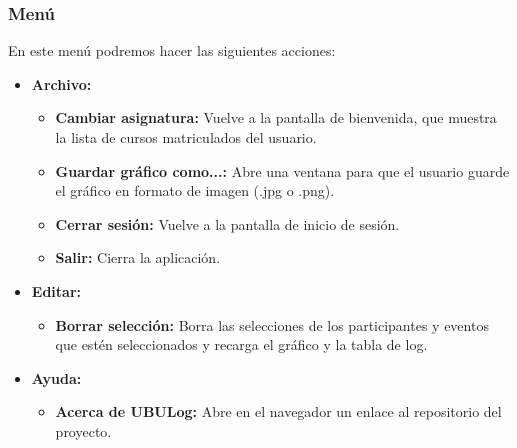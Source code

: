 
\subsubsection{Menú}


En este menú podremos hacer las siguientes acciones:

\begin{itemize}
	\tightlist
	\item
	\textbf{Archivo:}
	\begin{itemize}
		\tightlist
		\item
		\textbf{Cambiar asignatura:} Vuelve a la pantalla de bienvenida, que muestra la lista de cursos matriculados del usuario.
		\item
		\textbf{Guardar gráfico como...:} Abre una ventana para que el usuario guarde el gráfico en formato de imagen (.jpg o .png).
		\item
		\textbf{Cerrar sesión:} Vuelve a la pantalla de inicio de sesión.
		\item
		\textbf{Salir:} Cierra la aplicación.
	\end{itemize}
	\item
	\textbf{Editar:}
	\begin{itemize}
		\tightlist
		\item
		\textbf{Borrar selección:} Borra las selecciones de los participantes y eventos que estén seleccionados y recarga el gráfico y la tabla de log.
	\end{itemize}
	\item
	\textbf{Ayuda:}
	\begin{itemize}
		\tightlist
		\item
		\textbf{Acerca de UBULog:} Abre en el navegador un enlace al repositorio del proyecto.
	\end{itemize}
\end{itemize}










